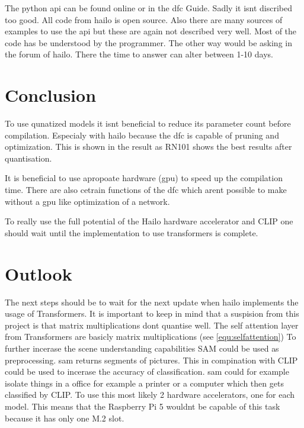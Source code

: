 The python \acrfull{api} can be found online or in the \acrshort{dfc} Guide.
Sadly it isnt discribed too good.
All code from hailo is open source.
Also there are many sources of examples to use the \acrshort{api} but these are again not described very well.
Most of the code has be understood by the programmer.
The other way would be asking in the forum of hailo.
There the time to answer can alter between 1-10 days.



\section{Conclusion}

To use qunatized models it isnt beneficial to reduce its parameter count before compilation.
Especialy with hailo because the \acrshort{dfc} is capable of pruning and optimization.
This is shown in the result as RN101 shows the best results after quantisation.

It is beneficial to use apropoate hardware (\acrshort{gpu}) to speed up the compilation time.
There are also cetrain functions of the \acrshort{dfc} which arent possible to make without a \acrshort{gpu} like optimization of a network.

To really use the full potential of the Hailo hardware accelerator and CLIP one should wait until the implementation to use transformers is complete. 

\section{Outlook}

The next steps should be to wait for the next update when hailo implements the usage of Transformers.
It is important to keep in mind that a suspision from this project is that matrix multiplications dont quantise well.
The self attention layer from Transformers are basicly matrix multiplications (see \cref{equ:selfattention})
To further incerase the scene understanding capabilities SAM\cite{sam} could be used as preprocessing.
\acrshort{sam} returns segments of pictures.
This in compination with CLIP could be used to incerase the accuracy of classification.
\acrshort{sam} could for example isolate things in a office for example a printer or a computer which then gets classified by CLIP.
To use this most likely 2 hardware accelerators, one for each model.
This means that the Raspberry Pi 5 wouldnt be capable of this task because it has only one M.2 slot.

